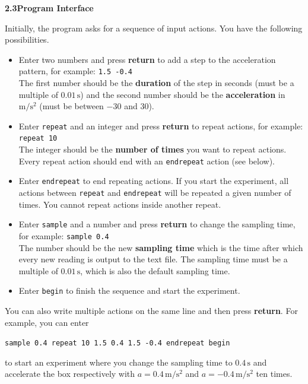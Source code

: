 {\large\textbf{2.3\quad Program Interface}}

Initially, the program asks for a sequence of input actions. You have the
following possibilities.
\begin{itemize}
\item Enter two numbers and press \textbf{return} to add a step to the
acceleration pattern, for example: \texttt{1.5 -0.4}\\
The first number should be the \textbf{duration} of the step in seconds (must
be a multiple of $0.01\,\mathrm{s}$) and the second number should be the
\textbf{acceleration} in $\mathrm{m/s^2}$ (must be between $-30$ and $30$).
\item Enter \texttt{repeat} and an integer and press \textbf{return} to repeat
actions, for example: \texttt{repeat 10}\\
The integer should be the \textbf{number of times} you want to repeat actions.
Every repeat action should end with an \texttt{endrepeat} action (see below).
\item Enter \texttt{endrepeat} to end repeating actions. If you start the
experiment, all actions between \texttt{repeat} and \texttt{endrepeat} will be
repeated a given number of times. You cannot repeat actions inside another
repeat.
\item Enter \texttt{sample} and a number and press \textbf{return} to change
the sampling time, for example: \texttt{sample 0.4}\\
The number should be the new \textbf{sampling time} which is the time after
which every new reading is output to the text file. The sampling time must be a
multiple of $0.01\,\mathrm{s}$, which is also the default sampling time.
\item Enter \texttt{begin} to finish the sequence and start the experiment.
\end{itemize}

You can also write multiple actions on the same line and then press
\textbf{return}. For example, you can enter

\texttt{sample 0.4 repeat 10 1.5 0.4 1.5 -0.4 endrepeat begin}

to start an experiment where you change the sampling time to $0.4\,\mathrm{s}$
and accelerate the box respectively with $a = 0.4\,\mathrm{m/s^2}$ and
$a = -0.4\,\mathrm{m/s^2}$ ten times.


